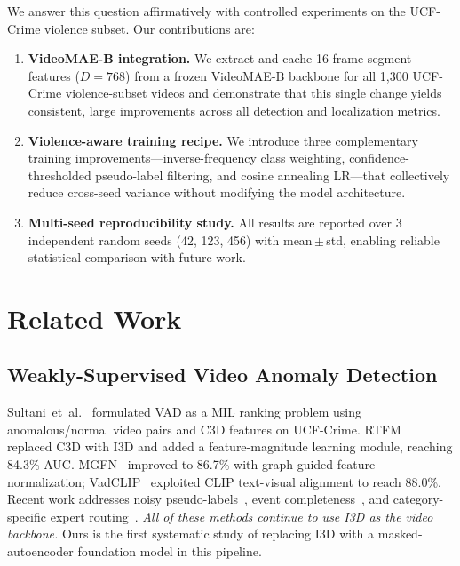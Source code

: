 \documentclass[sigconf,nonacm]{acmart}
\begin{document}
We answer this question affirmatively with controlled experiments on
the UCF-Crime violence subset.
Our contributions are:

\begin{enumerate}
  \item \textbf{VideoMAE-B integration.}
        We extract and cache 16-frame segment features ($D{=}768$) from a
        frozen VideoMAE-B backbone for all 1{,}300 UCF-Crime violence-subset
        videos and demonstrate that this single change yields consistent,
        large improvements across all detection and localization metrics.

  \item \textbf{Violence-aware training recipe.}
        We introduce three complementary training improvements—inverse-frequency
        class weighting, confidence-thresholded pseudo-label filtering, and
        cosine annealing LR—that collectively reduce cross-seed variance without
        modifying the model architecture.

  \item \textbf{Multi-seed reproducibility study.}
        All results are reported over 3 independent random seeds (42, 123, 456)
        with mean\,$\pm$\,std, enabling reliable statistical comparison with
        future work.
\end{enumerate}


\section{Related Work}

\subsection{Weakly-Supervised Video Anomaly Detection}

Sultani~et~al.~\cite{sultani2018real} formulated VAD as a MIL ranking
problem using anomalous/normal video pairs and C3D features on UCF-Crime.
RTFM~\cite{tian2021weakly} replaced C3D with I3D and added a feature-magnitude
learning module, reaching 84.3\% AUC.
MGFN~\cite{chen2023mgfn} improved to 86.7\% with graph-guided feature
normalization; VadCLIP~\cite{wu2024vadclip} exploited CLIP text-visual
alignment to reach 88.0\%.
Recent work addresses noisy pseudo-labels~\cite{lan2025dss,wang2025dakd},
event completeness~\cite{tian2025lecvad}, and category-specific expert
routing~\cite{wang2025gsmoe}.
\emph{All of these methods continue to use I3D as the video backbone.}
Ours is the first systematic study of replacing I3D with a
masked-autoencoder foundation model in this pipeline.
\end{document}
